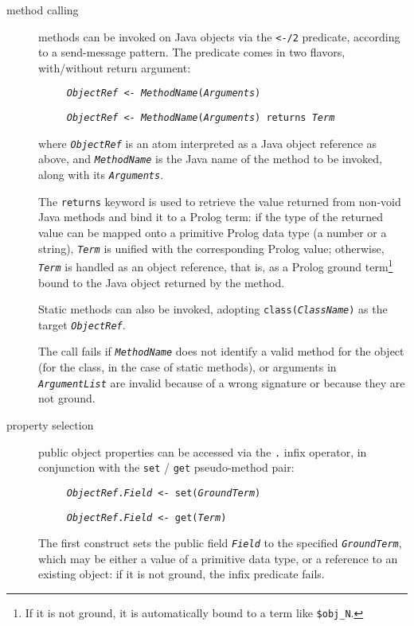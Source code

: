 \begin{description}
  \item [method calling]
        methods can be invoked on Java objects via the \texttt{<-/2} predicate,
        according to a send-message pattern. The predicate comes in two flavors, with/without return argument:

        \texttt{~~~~~\textit{ObjectRef} <- \textit{MethodName}(\textit{Arguments})}

        \texttt{~~~~~\textit{ObjectRef} <- \textit{MethodName}(\textit{Arguments})
                returns \textit{Term}}

        where \texttt{\textit{ObjectRef}} is an atom interpreted as a Java object
        reference as above, and \texttt{\textit{MethodName}} is the Java name of the method to be invoked, along with its \texttt{\textit{Arguments}}.
        
        The \texttt{returns} keyword is used to retrieve the value returned from non-void Java methods and bind it to a Prolog term: if the type of the returned value can be mapped onto a primitive Prolog data type (a number or a string), \texttt{\textit{Term}} is unified with the corresponding Prolog value; otherwise, \texttt{\textit{Term}} is handled as an object reference, that is, as a Prolog ground term\footnote{If it is not ground, it is automatically bound to a term like \texttt{\$obj\_N}.} bound to the Java object returned by the method.

        Static methods can also be invoked, adopting \texttt{class(\textit{ClassName})} as the target \texttt{\textit{ObjectRef}}.
        
        The call fails if \texttt{\textit{MethodName}} does not identify a valid method for the object (for the class, in the case of static methods), or arguments in \texttt{\textit{ArgumentList}} are invalid because of a wrong signature or because they are not ground.

  \item [property selection]
        public object properties can be accessed via the \texttt{.} infix operator, in conjunction with the \texttt{set} / \texttt{get} pseudo-method pair:
        
        \texttt{~~~~~\textit{ObjectRef}.\textit{Field} <- set(\textit{GroundTerm})}
        
        \texttt{~~~~~\textit{ObjectRef}.\textit{Field} <- get(\textit{Term})}
        
        The first construct sets the public field \texttt{\textit{Field}} to the specified \texttt{\textit{GroundTerm}}, which may be either a value of a primitive data type, or a reference to an existing object: if it is not ground, the infix predicate fails.
        

\end{description}
